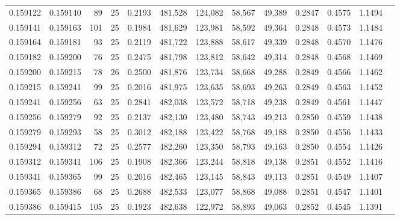 \begin{tabular}{rrrrrrrrrrrrr}
0.159122 & 0.159140 &    89 &  25 &                                     0.2193 & 481,528 & 124,082 &  58,567 &  49,389 & 0.2847 & 0.4575 & 1.1494 \\
0.159141 & 0.159163 &   101 &  25 &                                     0.1984 & 481,629 & 123,981 &  58,592 &  49,364 & 0.2848 & 0.4573 & 1.1484 \\
0.159164 & 0.159181 &    93 &  25 &                                     0.2119 & 481,722 & 123,888 &  58,617 &  49,339 & 0.2848 & 0.4570 & 1.1476 \\
0.159182 & 0.159200 &    76 &  25 &                                     0.2475 & 481,798 & 123,812 &  58,642 &  49,314 & 0.2848 & 0.4568 & 1.1469 \\
0.159200 & 0.159215 &    78 &  26 &                                     0.2500 & 481,876 & 123,734 &  58,668 &  49,288 & 0.2849 & 0.4566 & 1.1462 \\
0.159215 & 0.159241 &    99 &  25 &                                     0.2016 & 481,975 & 123,635 &  58,693 &  49,263 & 0.2849 & 0.4563 & 1.1452 \\
0.159241 & 0.159256 &    63 &  25 &                                     0.2841 & 482,038 & 123,572 &  58,718 &  49,238 & 0.2849 & 0.4561 & 1.1447 \\
0.159256 & 0.159279 &    92 &  25 &                                     0.2137 & 482,130 & 123,480 &  58,743 &  49,213 & 0.2850 & 0.4559 & 1.1438 \\
0.159279 & 0.159293 &    58 &  25 &                                     0.3012 & 482,188 & 123,422 &  58,768 &  49,188 & 0.2850 & 0.4556 & 1.1433 \\
0.159294 & 0.159312 &    72 &  25 &                                     0.2577 & 482,260 & 123,350 &  58,793 &  49,163 & 0.2850 & 0.4554 & 1.1426 \\
0.159312 & 0.159341 &   106 &  25 &                                     0.1908 & 482,366 & 123,244 &  58,818 &  49,138 & 0.2851 & 0.4552 & 1.1416 \\
0.159341 & 0.159365 &    99 &  25 &                                     0.2016 & 482,465 & 123,145 &  58,843 &  49,113 & 0.2851 & 0.4549 & 1.1407 \\
0.159365 & 0.159386 &    68 &  25 &                                     0.2688 & 482,533 & 123,077 &  58,868 &  49,088 & 0.2851 & 0.4547 & 1.1401 \\
0.159386 & 0.159415 &   105 &  25 &                                     0.1923 & 482,638 & 122,972 &  58,893 &  49,063 & 0.2852 & 0.4545 & 1.1391 \\

\end{tabular}
